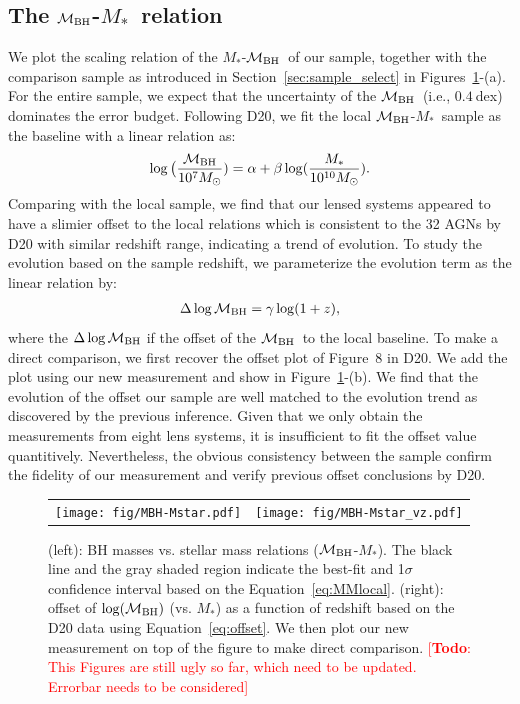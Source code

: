 \documentclass[fleqn,usenatbib]{mnras}
\newcommand{\mbh}{$\mathcal M_{\rm BH}$}
\newcommand{\mstar}{{$M_*$}}
\newcommand{\todo}[1]{\textcolor{red}{[{\bf Todo}: #1]}}
\begin{document}
\subsection{The \mbh-\mstar\ relation}\label{sec:relation}
We plot the scaling relation of the \mstar-\mbh\ of our sample, together with the comparison sample as introduced in Section~\ref{sec:sample_select} in Figures~\ref{fig:scaling_relation}-(a). For the entire sample, we expect that the uncertainty of the \mbh\ (i.e., $0.4~$dex) dominates the error budget. Following D20, we fit the local \mbh-\mstar\ sample as the baseline with a linear relation as:
\begin{eqnarray}
\label{eq:MMlocal}
\log \big( \frac{\mathcal M_{\rm BH}}{10^{7}M_{\odot}})= \alpha + \beta \log(\frac{M_*}{10^{10}M_{\odot}}).
\end {eqnarray}
Comparing with the local sample, we find that our lensed systems appeared to have a slimier offset to the local relations which is consistent to the 32 AGNs by D20 with similar redshift range, indicating a trend of evolution. To study the evolution based on the sample redshift, we parameterize the evolution term as the linear relation by:
\begin{eqnarray}
\label{eq:offset}
\Delta \log \mathcal M_{\rm BH}= \gamma \log (1 + z),
\end{eqnarray} 
where the $\Delta \log \mathcal M_{\rm BH}$ if the offset of the \mbh\ to the local baseline. To make a direct comparison, we first recover the offset plot of Figure~8 in D20. We add the plot using our new measurement and show in Figure~\ref{fig:scaling_relation}-(b). We find that the evolution of the offset our sample are well matched to the evolution trend as discovered by the previous inference. Given that we only obtain the measurements from eight lens systems, it is insufficient to fit the offset value quantitively. Nevertheless, the obvious consistency between the sample confirm the fidelity of our measurement and verify previous offset conclusions by D20.

\begin{figure}
\centering
\begin{tabular}{c c}
{\texttt{[image: fig/MBH-Mstar.pdf]}}&
{\texttt{[image: fig/MBH-Mstar\_vz.pdf]}}\\
\end{tabular}
\caption{\label{fig:scaling_relation} 
(left): BH masses vs. stellar mass relations (\mbh-\mstar). The black line and the gray shaded region indicate the best-fit and 1$\sigma$ confidence interval based on the Equation~\ref{eq:MMlocal}.
(right): offset of $\log(\mathcal M_{\rm BH})$ (vs. \mstar) as a function of redshift based on the D20 data using Equation~\ref{eq:offset}. We then plot our new measurement on top of the figure to make direct comparison. 
\todo{This Figures are still ugly so far, which need to be updated. Errorbar needs to be considered}}
\end{figure} 
\end{document}
